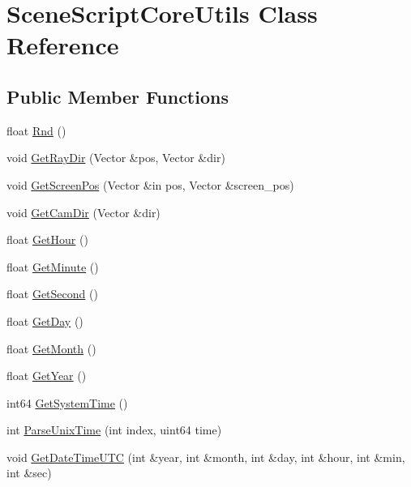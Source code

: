 \hypertarget{class_scene_script_core_utils}{}\section{Scene\+Script\+Core\+Utils Class Reference}
\label{class_scene_script_core_utils}
\subsection*{Public Member Functions}
\begin{DoxyCompactItemize}
\item 
float \hyperlink{class_scene_script_core_utils_a0ad6eabfa539ad83e39b51f4c9949009}{Rnd} ()
\item 
void \hyperlink{class_scene_script_core_utils_a0fa3be6ad21276f85207db050bbe7c8d}{Get\+Ray\+Dir} (Vector \&pos, Vector \&dir)
\item 
void \hyperlink{class_scene_script_core_utils_a65568a59d7bb3ed4048223b1415e815b}{Get\+Screen\+Pos} (Vector \&in pos, Vector \&screen\+\_\+pos)
\item 
void \hyperlink{class_scene_script_core_utils_a6e17557a95868df25c7639ad9e3af37f}{Get\+Cam\+Dir} (Vector \&dir)
\item 
float \hyperlink{class_scene_script_core_utils_a9c899b92c5c7c6132730b7c98011067e}{Get\+Hour} ()
\item 
float \hyperlink{class_scene_script_core_utils_a51257caacd09badefecbeeafb4fbfbb1}{Get\+Minute} ()
\item 
float \hyperlink{class_scene_script_core_utils_aa11532473220da4cce608725cb3e8a35}{Get\+Second} ()
\item 
float \hyperlink{class_scene_script_core_utils_a6b33a3054c5f86ec3e7d371e490eae79}{Get\+Day} ()
\item 
float \hyperlink{class_scene_script_core_utils_a4ee852179c20abe1f58f21c8ae6d494c}{Get\+Month} ()
\item 
float \hyperlink{class_scene_script_core_utils_a51a9b16c409c5b8c58979208dcc5dfab}{Get\+Year} ()
\item 
int64 \hyperlink{class_scene_script_core_utils_ab7c6e31eac5937558ffb14ea657b094e}{Get\+System\+Time} ()
\item 
int \hyperlink{class_scene_script_core_utils_a9decb7a6ccb332314d9cffa1bf60350a}{Parse\+Unix\+Time} (int index, uint64 time)
\item 
void \hyperlink{class_scene_script_core_utils_a72d964d4efe6e40bca2f81f36b3d47f4}{Get\+Date\+Time\+U\+TC} (int \&year, int \&month, int \&day, int \&hour, int \&min, int \&sec)

\end{DoxyCompactItemize}
